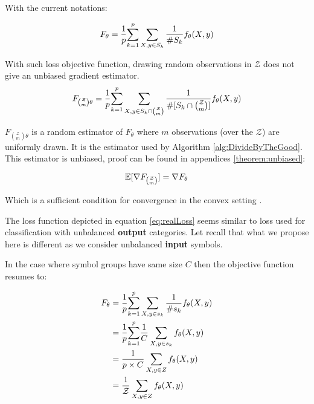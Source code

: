 
With the current notations:



\begin{equation}\label{eq:realLoss}
    F_{\theta} = \frac{1}{p} \underset{k=1}{\overset{p}{\sum}} \sum_{X,y \in S_k}  \frac{1}{\# S_k} f_{\theta} (X, y)
\end{equation}

With such loss objective function, drawing random observations in $\mathcal{Z}$ does not give an unbiased gradient estimator.
\begin{equation*}
    F_{\binom{\mathcal{Z}}{m} \theta} = \frac{1}{p} \underset{k=1}{\overset{p}{\sum}} \sum_{X,y \in S_k \cap \binom{\mathcal{Z}}{m}}  \frac{1}{\#[ S_k \cap \binom{\mathcal{Z}}{m}]} f_{\theta} (X, y)
\end{equation*}


$F_{\binom{\mathcal{Z}}{m} \theta}$ is a random estimator of $F_{\theta}$ where $m$ observations (over the $\mathcal{Z}$) are uniformly drawn. It is the estimator used by Algorithm \ref{alg:DivideByTheGood}. This estimator is unbiased, proof can be found in appendices \ref{theorem:unbiased}:

\begin{equation*}
    \mathbb{E}[\nabla F_{\binom{\mathcal{Z}}{m}}] = \nabla F_{\theta}
\end{equation*}

Which is a sufficient condition for convergence in the convex setting \cite{BachProof}.

 
The loss function depicted in equation \ref{eq:realLoss} seems similar to loss used for classification with unbalanced \textbf{output} categories. Let recall that what we propose here is different as we consider unbalanced \textbf{input} symbols. 

In the case where symbol groups have same size $C$ then the objective function resumes to:

\begin{align*}
    F_{\theta} &= \frac{1}{p}            \underset{k=1}{\overset{p}{\sum}} \sum_{X,y \in s_k} \frac{1}{\# s_k} f_{\theta} (X, y)\\
               &= \frac{1}{p}            \underset{k=1}{\overset{p}{\sum}}  \frac{1}{C} \sum_{X,y \in s_k}       f_{\theta} (X, y)\\
               &= \frac{1}{p \times C}   \sum_{X,y \in Z}                                      f_{\theta} (X, y)\\
                &= \frac{1}{\mathcal{Z}} \sum_{X,y \in Z}                                      f_{\theta} (X, y)
\end{align*}

